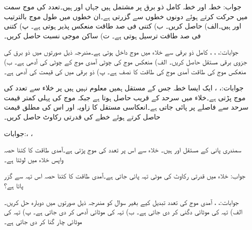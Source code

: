 جواب:
خطہ  اور خطہ  کامل ذو برق پر مشتمل ہیں جہاں  اور  ہیں۔تعدد  کی موج  سمت میں حرکت کرتے ہوئے دونوں خطوں سے گزرتی ہے۔ان خطوں میں طول موج بالترتیب  اور  ہیں۔الف)  حاصل کریں۔ ب) کتنی فی صد طاقت منعکس پذیر ہوتی ہے۔ پ) کتنی فی صد طاقت ترسیل ہوتی ہے۔ ت) ساکن موجی نسبت  حاصل کریں۔

جوابات:، ، ، 
کامل ذو برقی  سے خلاء میں موج داخل ہوتی ہے۔مندرجہ ذیل صورتوں میں ذو برق کی جزوی برقی مستقل  حاصل کریں۔ الف) منعکس موج کی چوٹی آمدی موج کے چوٹی کی آدھی ہے۔ ب) منعکس موج کی طاقت آمدی موج کی طاقت کا نصف ہے۔ پ) ذو برقی میں  کی قیمت  کی آدھی ہے۔

جوابات:، ، 
ایک ایسا خطہ جس کے مستقل ہمیں معلوم نہیں ہیں پر خلاء سے  تعدد کی موج پڑتی ہے۔خلاء میں سرحد کے قریب  حاصل ہوتا ہے جبکہ موج کی پہلی کمتر قیمت سرحد سے  فاصلے پر پائی جاتی ہے۔انعکاسی مستقل کا زاویہ  اور اس کی مطلق قیمت  حاصل کرتے ہوئے خطے کی قدرتی رکاوٹ حاصل کریں۔

جوابات:، ،    

سمندری پانی کے مستقل  اور  ہیں۔ خلاء سے اس پر  تعدد کی موج پڑتی ہے۔آمدی طاقت کا کتنا حصہ واپس خلاء میں لوٹتا ہے۔

جواب: 
خلاء میں  قدرتی رکاوٹ کی  موٹی تہہ پائی جاتی ہے۔آمدی طاقت کا کتنا حصہ اس تہہ سے گزر پاتا ہے؟ 

جوابات:، ،  
آمدی موج کی تعدد تبدیل کیے بغیر سوال  کو مندرجہ ذیل صورتوں میں دوبارہ حل کریں۔ الف) تہہ کی موٹائی دگنی کر دی جاتی ہے۔ ب) تہہ کی موٹائی آدھی کر دی جاتی ہے۔ پ) تہہ کی موٹائی  چار گنا کر دی جاتی ہے۔

